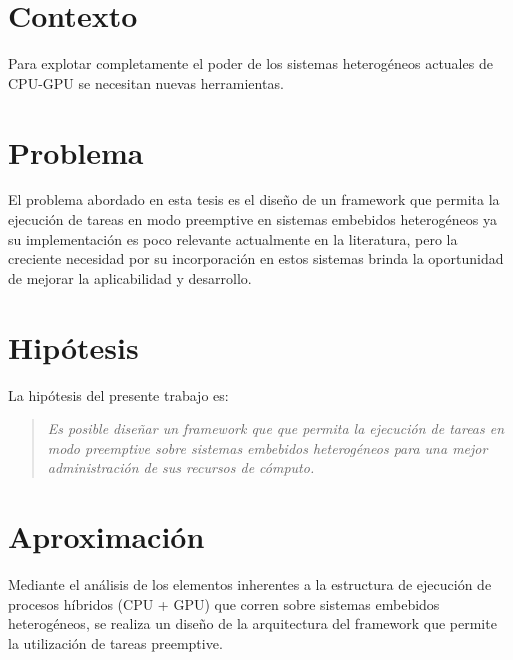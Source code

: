 
\section{Contexto}

Para explotar completamente el poder de los sistemas heterogéneos actuales de CPU-GPU se necesitan nuevas herramientas.

\section{Problema}

El problema abordado en esta tesis es el diseño de un framework que permita la ejecución de tareas en modo preemptive en sistemas embebidos heterogéneos ya su implementación es poco relevante actualmente en la literatura, pero la creciente necesidad por su incorporación en estos sistemas brinda la oportunidad de mejorar la aplicabilidad y desarrollo. 

\section{Hipótesis}

La hipótesis del presente trabajo es:

\begin{quote}
\textit{Es posible diseñar un framework que que permita la ejecución de tareas en modo preemptive sobre sistemas embebidos heterogéneos para una mejor administración de sus recursos de cómputo.}
\end{quote}


\section{Aproximación}

Mediante el análisis de los elementos inherentes a la estructura de ejecución de procesos híbridos (CPU + GPU) que corren sobre sistemas embebidos heterogéneos, se realiza un diseño de la arquitectura del framework que permite la utilización de tareas preemptive.

